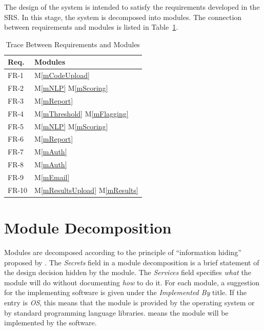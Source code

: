 \documentclass[12pt, titlepage]{article}
\newcommand{\mref}[1]{M\ref{#1}}
\begin{document}
The design of the system is intended to satisfy the requirements developed in
the SRS. In this stage, the system is decomposed into modules. The connection
between requirements and modules is listed in Table~\ref{TblRT}.
\begin{table}[H]
  \centering
  \begin{tabular}{p{} p{}}
  \toprule
  \textbf{Req.} & \textbf{Modules}\\
  \midrule
  FR-1 & \mref{mCodeUpload} \\
  FR-2 & \mref{mNLP} \mref{mScoring} \\
  FR-3 & \mref{mReport}\\
  FR-4 & \mref{mThreshold} \mref{mFlagging}\\
  FR-5 & \mref{mNLP} \mref{mScoring} \\
  FR-6 & \mref{mReport} \\
  FR-7 & \mref{mAuth} \\
  FR-8 & \mref{mAuth} \\
  FR-9 & \mref{mEmail} \\
  FR-10 & \mref{mResultsUpload} \mref{mResults}\\
  \bottomrule
  \end{tabular}
  \caption{Trace Between Requirements and Modules}
  \label{TblRT}
\end{table}
  


\section{Module Decomposition} \label{SecMD}

Modules are decomposed according to the principle of ``information hiding''
proposed by \citet{ParnasEtAl1984}. The \emph{Secrets} field in a module
decomposition is a brief statement of the design decision hidden by the
module. The \emph{Services} field specifies \emph{what} the module will do
without documenting \emph{how} to do it. For each module, a suggestion for the
implementing software is given under the \emph{Implemented By} title. If the
entry is \emph{OS}, this means that the module is provided by the operating
system or by standard programming language libraries.  \emph{\progname{}} means the
module will be implemented by the \progname{} software.
\end{document}
